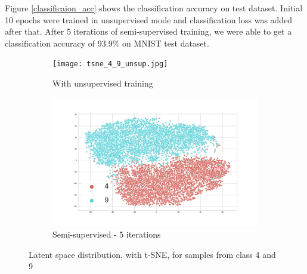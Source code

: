 \documentclass[runningheads]{llncs}
\begin{document}
Figure \ref{classificaion_acc} shows the  classification accuracy on test dataset.
Initial 10 epochs were trained in unsupervised mode and classification loss was added after that.
After 5 iterations of semi-supervised training, we were able to get a classification accuracy of 93.9\% on MNIST test dataset.

\begin{figure}[!t]
\centering
\begin{subfigure}[t]{.45\textwidth}
  \centering
  \texttt{[image: tsne\_4\_9\_unsup.jpg]}
  \caption{With unsupervised training}
  \label{tsne_un_4_9}
\end{subfigure}\hfill
\begin{subfigure}[t]{.45\textwidth}
  \centering
  \includegraphics[width=0.9\linewidth]{tsne_4_9_semi.jpg}
  \caption{Semi-supervised - 5 iterations}
  \label{tsne_semi_4_9}
\end{subfigure}
\caption{Latent space distribution, with t-SNE, for samples from class 4 and 9}
\label{tsne_4_9}
\end{figure}

\end{document}

